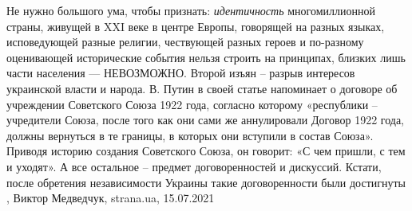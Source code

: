 Не нужно большого ума, чтобы признать: \emph{идентичность} многомиллионной
страны, живущей в XXI веке в центре Европы, говорящей на разных языках,
исповедующей разные религии, чествующей разных героев и по-разному оценивающей
исторические события нельзя строить на принципах, близких лишь части населения
— НЕВОЗМОЖНО.  Второй изъян – разрыв интересов украинской власти и народа.  В.
Путин в своей статье напоминает о договоре об учреждении Советского Союза 1922
года, согласно которому «республики – учредители Союза, после того как они сами
же аннулировали Договор 1922 года, должны вернуться в те границы, в которых они
вступили в состав Союза». Приводя историю создания Советского Союза, он
говорит: «С чем пришли, с тем и уходят». А все остальное – предмет
договоренностей и дискуссий. Кстати, после обретения независимости Украины
такие договоренности были достигнуты
, 
Виктор Медведчук, strana.ua, 15.07.2021
